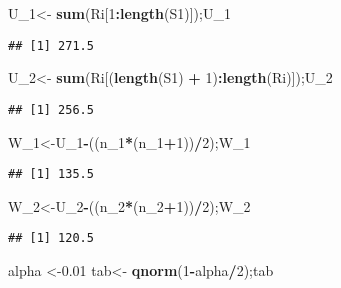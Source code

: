 \documentclass[
]{article}
\newenvironment{Shaded}{\begin{snugshade}}{\end{snugshade}}
\newcommand{\DecValTok}[1]{\textcolor[rgb]{0.00,0.00,0.81}{#1}}
\newcommand{\FloatTok}[1]{\textcolor[rgb]{0.00,0.00,0.81}{#1}}
\newcommand{\FunctionTok}[1]{\textcolor[rgb]{0.13,0.29,0.53}{\textbf{#1}}}
\newcommand{\NormalTok}[1]{#1}
\newcommand{\OtherTok}[1]{\textcolor[rgb]{0.56,0.35,0.01}{#1}}
\newcommand{\SpecialCharTok}[1]{\textcolor[rgb]{0.81,0.36,0.00}{\textbf{#1}}}
\begin{document}
\begin{Shaded}
\begin{Highlighting}[]
\NormalTok{U\_1}\OtherTok{\textless{}{-}} \FunctionTok{sum}\NormalTok{(Ri[}\DecValTok{1}\SpecialCharTok{:}\FunctionTok{length}\NormalTok{(S1)]);U\_1}
\end{Highlighting}
\end{Shaded}

\begin{verbatim}
## [1] 271.5
\end{verbatim}

\begin{Shaded}
\begin{Highlighting}[]
\NormalTok{U\_2}\OtherTok{\textless{}{-}} \FunctionTok{sum}\NormalTok{(Ri[(}\FunctionTok{length}\NormalTok{(S1) }\SpecialCharTok{+} \DecValTok{1}\NormalTok{)}\SpecialCharTok{:}\FunctionTok{length}\NormalTok{(Ri)]);U\_2}
\end{Highlighting}
\end{Shaded}

\begin{verbatim}
## [1] 256.5
\end{verbatim}

\begin{Shaded}
\begin{Highlighting}[]
\NormalTok{W\_1}\OtherTok{\textless{}{-}}\NormalTok{U\_1}\SpecialCharTok{{-}}\NormalTok{((n\_1}\SpecialCharTok{*}\NormalTok{(n\_1}\SpecialCharTok{+}\DecValTok{1}\NormalTok{))}\SpecialCharTok{/}\DecValTok{2}\NormalTok{);W\_1}
\end{Highlighting}
\end{Shaded}

\begin{verbatim}
## [1] 135.5
\end{verbatim}

\begin{Shaded}
\begin{Highlighting}[]
\NormalTok{W\_2}\OtherTok{\textless{}{-}}\NormalTok{U\_2}\SpecialCharTok{{-}}\NormalTok{((n\_2}\SpecialCharTok{*}\NormalTok{(n\_2}\SpecialCharTok{+}\DecValTok{1}\NormalTok{))}\SpecialCharTok{/}\DecValTok{2}\NormalTok{);W\_2}
\end{Highlighting}
\end{Shaded}

\begin{verbatim}
## [1] 120.5
\end{verbatim}

\begin{Shaded}
\begin{Highlighting}[]
\NormalTok{alpha }\OtherTok{\textless{}{-}}\FloatTok{0.01}
\NormalTok{tab}\OtherTok{\textless{}{-}} \FunctionTok{qnorm}\NormalTok{(}\DecValTok{1}\SpecialCharTok{{-}}\NormalTok{alpha}\SpecialCharTok{/}\DecValTok{2}\NormalTok{);tab}
\end{Highlighting}
\end{Shaded}
\end{document}
